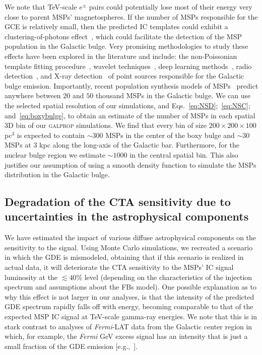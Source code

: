 \documentclass[doublespace,nopageskip]{VTthesis} %
\begin{document}
We note that TeV-scale $e^{\pm}$ pairs could potentially lose most of their energy very close to parent MSPs' magnetospheres. If the number of MSPs responsible for the GCE is relatively small, then the predicted IC templates could exhibit a clustering-of-photons effect~\citep{Acharyya:2020sbj}, which could facilitate the detection of the MSP population in the Galactic bulge.  Very promising methodologies to study these effects have been explored in the literature and include: the non-Poissonian template fitting procedure~\cite{Lee:2015fea,Leane:2019xiy,Chang:2019ars,Leane:2020pfc,Leane:2020nmi,Buschmann:2020adf}, wavelet techniques~\cite{Bartels:2015aea,Balaji:2018rwz,Zhong:2019ycb}, deep learning methods~\citep{Caron:2017udl,List:2020mzd}, radio detection~\citep{Calore:2015bsx,2015ApJ...805..172M,2017MNRAS.471..730R,2019ApJ...876...20H}, and X-ray detection~\citep{Berteaud:2020zef} of point sources responsible for the Galactic bulge emission.
%
Importantly, recent population synthesis models of MSPs~\citep{Ploeg:2020jeh} predict anywhere between $20$ and $50$ thousand MSPs in the Galactic bulge. We can use the selected spatial resolution of our simulations, and Eqs.~\ref{eq:NSD};~\ref{eq:NSC}; and~\ref{eq:boxybulge}, to obtain an estimate of the number of MSPs in each spatial 3D bin of our \textsc{galprop} simulations. We find that every bin of size $200\times200\times100$ pc$^3$ is expected to contain $\sim 300$ MSPs in the center of the boxy bulge and $\sim 30$ MSPs at 3 kpc along the long-axis of the Galactic bar. Furthermore, for the nuclear bulge region we estimate $\sim 1000$ in the central spatial bin.  This also justifies our assumption of using a smooth density function to simulate the MSPs distribution in the Galactic bulge. 



\subsection{Degradation of the CTA sensitivity due to uncertainties in the astrophysical components}

 We have estimated the impact of various diffuse astrophysical components on the sensitivity to the signal. Using Monte Carlo simulations, we recreated a scenario in which the GDE is mismodeled, obtaining that if this scenario is realized in actual data, it will deteriorate the CTA sensitivity to the MSPs' IC signal luminosity at the $\lesssim 40\%$ level (depending on the characteristics of the injection spectrum and assumptions about the FBs model). 
 One possible explanation as to why this effect is not larger in our analyses, is that the intensity of the predicted GDE spectrum rapidly falls off with energy, becoming comparable to that of the expected MSP IC signal at TeV-scale gamma-ray energies. We note that this is in stark contrast to analyses of \textit{Fermi}-LAT data from the Galactic center region in which, for example, the \textit{Fermi} GeV excess signal has an intensity that is just a small fraction of the GDE emission [e.g.,~\citet{Abazajian:2020tww}].
\end{document}
